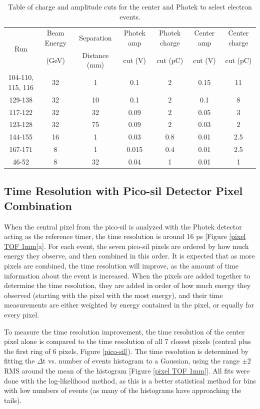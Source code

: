 \documentclass[twocolumn,aps,prd,reprint]{revtex4-1}
\begin{document}
\begin{centering}
\begin{table}[!htbp]
  \begin{tabular}{ | c | c | c | c | c | c | c | }
    \hline
    \multirow{2}{*}{Run} & Beam Energy & Separation & Photek amp & Photek charge & Center amp & Center charge \\
 & (GeV) & Distance (mm) & cut (V) & cut (pC) & cut (V) & cut (pC) \\ \hline
    104-110, 115, 116 & 32 & 1 & 0.1 & 2 & 0.15 & 11 \\ \hline
    129-138 & 32 & 10 & 0.1 & 2 & 0.1 & 8 \\ \hline
    117-122 & 32 & 32 & 0.09 & 2 & 0.05 & 3 \\	\hline
    123-128 & 32 & 75 & 0.09 & 2 & 0.03 & 2 \\ \hline
    144-155 & 16 & 1 & 0.03 & 0.8 & 0.01 & 2.5 \\ \hline
	167-171 & 8 & 1 & 0.015 & 0.4 & 0.01 & 2.5 \\ \hline
	46-52 & 8 & 32 & 0.04 & 1 & 0.01 & 1 \\ \hline
  \end{tabular}
\caption[Table caption text]{Table of charge and amplitude cuts for the center and Photek to select electron events.}
\label{table:cuts}
\end{table}
\end{centering}

\subsection{Time Resolution with Pico-sil Detector Pixel Combination}

When the central pixel from the pico-sil is analyzed with the Photek detector acting as the reference timer, the time resolution is around 16 ps [Figure \ref{pixel TOF 1mm}a]. For each event, the seven pico-sil pixels are ordered by how much energy they observe, and then combined in this order. It is expected that as more pixels are combined, the time resolution will improve, as the amount of time information about the event is increased. When the pixels are added together to determine the time resolution, they are added in order of how much energy they observed (starting with the pixel with the most energy), and their time measurements are either weighted by energy contained in the pixel, or equally for every pixel.

To measure the time resolution improvement, the time resolution of the center pixel alone is compared to the time resolution of all 7 closest pixels (central plus the first ring of 6 pixels, Figure \ref{pico-sil}). The time resolution is determined by fitting the $\Delta$t vs. number of events histogram to a Gaussian, using the range $\pm$2 RMS around the mean of the histogram [Figure \ref{pixel TOF 1mm}]. All fits were done with the log-likelihood method, as this is a better statistical method for bins with low numbers of events (as many of the histograms have approaching the tails).
\end{document}
